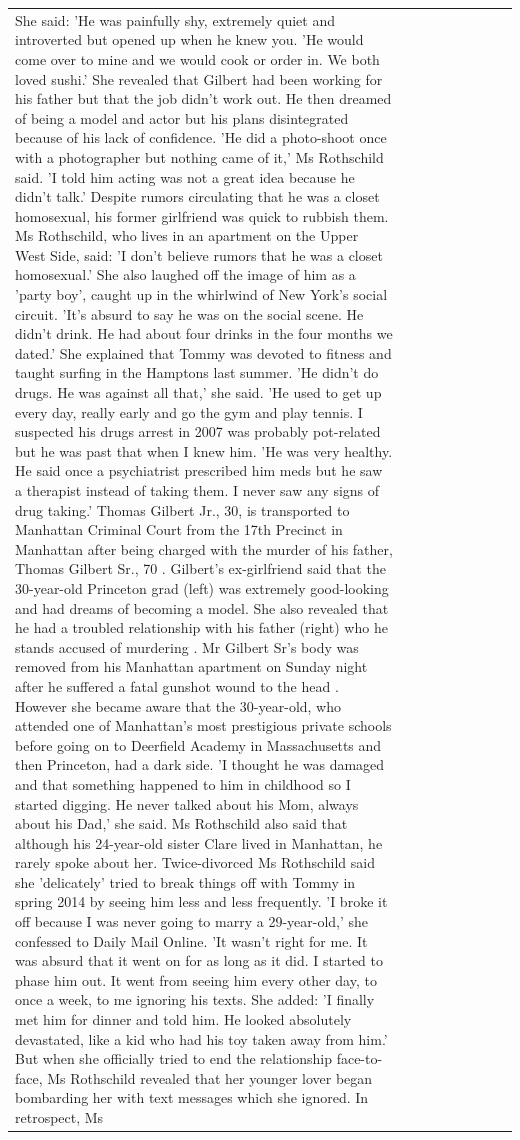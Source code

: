 \begin{table}[H]
\begin{tabular}{lllrlllll}
She said: 'He was painfully shy, extremely quiet and introverted but opened up when he knew you. 'He would come over to mine and we would cook or order in. We both loved sushi.' She revealed that Gilbert had been working for his father but that the job didn't work out. He then dreamed of being a model and actor but his plans disintegrated because of his lack of confidence. 'He did a photo-shoot once with a photographer but nothing came of it,' Ms Rothschild said. 'I told him acting was not a great idea because he didn’t talk.' Despite rumors circulating that he was a closet homosexual, his former girlfriend was quick to rubbish them. Ms Rothschild, who lives in an apartment on the Upper West Side, said: 'I don’t believe rumors that he was a closet homosexual.' She also laughed off the image of him as a 'party boy', caught up in the whirlwind of New York's social circuit. 'It’s absurd to say he was on the social scene. He didn’t drink. He had about four drinks in the four months we dated.' She explained that Tommy was devoted to fitness and taught surfing in the Hamptons last summer. 'He didn’t do drugs. He was against all that,' she said. 'He used to get up every day, really early and go the gym and play tennis. I suspected his drugs arrest in 2007 was probably pot-related but he was past that when I knew him. 'He was very healthy. He said once a psychiatrist prescribed him meds but he saw a therapist instead of taking them. I never saw any signs of drug taking.' Thomas Gilbert Jr., 30, is transported to Manhattan Criminal Court from the 17th Precinct in Manhattan after being charged with the murder of his father, Thomas Gilbert Sr., 70 . Gilbert's ex-girlfriend said that the 30-year-old Princeton grad (left) was extremely good-looking and had dreams of becoming a model. She also revealed that he had a troubled relationship with his father (right) who he stands accused of murdering . Mr Gilbert Sr's body was removed from his Manhattan apartment on Sunday night after he suffered a fatal gunshot wound to the head . However she became aware that the 30-year-old, who attended one of Manhattan's most prestigious private schools before going on to Deerfield Academy in Massachusetts and then Princeton, had a dark side. 'I thought he was damaged and that something happened to him in childhood so I started digging. He never talked about his Mom, always about his Dad,' she said. Ms Rothschild also said that although his 24-year-old sister Clare lived in Manhattan, he rarely spoke about her. Twice-divorced Ms Rothschild said she 'delicately' tried to break things off with Tommy in spring 2014 by seeing him less and less frequently. 'I broke it off because I was never going to marry a 29-year-old,' she confessed to Daily Mail Online. 'It wasn’t right for me. It was absurd that it went on for as long as it did. I started to phase him out. It went from seeing him every other day, to once a week, to me ignoring his texts. She added: 'I finally met him for dinner and told him. He looked absolutely devastated, like a kid who had his toy taken away from him.' But when she officially tried to end the relationship face-to-face, Ms Rothschild revealed that her younger lover began bombarding her with text messages which she ignored. In retrospect, Ms 
\end{tabular}
\end{table}
